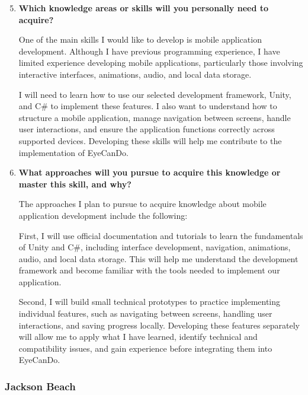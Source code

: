 \documentclass[10pt]{article}
\begin{document}
\begin{enumerate}
    \setcounter{enumi}{4}

    \item \textbf{Which knowledge areas or skills will you personally
    need to acquire?}

    One of the main skills I would like to develop is mobile
    application development. Although I have previous programming
    experience, I have limited experience developing mobile
    applications, particularly those involving interactive
    interfaces, animations, audio, and local data storage.

    I will need to learn how to use our selected development
    framework, Unity, and C\# to implement these features.
    I also want to understand how to structure a mobile
    application, manage navigation between screens, handle
    user interactions, and ensure the application functions
    correctly across supported devices. Developing these
    skills will help me contribute to the implementation
    of EyeCanDo.


    \item \textbf{What approaches will you pursue to acquire this
    knowledge or master this skill, and why?}

    The approaches I plan to pursue to acquire knowledge about
    mobile application development include the following:

    First, I will use official documentation and tutorials
    to learn the fundamentals of Unity and C\#, including
    interface development, navigation, animations, audio,
    and local data storage. This will help me understand
    the development framework and become familiar with
    the tools needed to implement our application.

    Second, I will build small technical prototypes to
    practice implementing individual features, such as
    navigating between screens, handling user interactions,
    and saving progress locally. Developing these features
    separately will allow me to apply what I have learned,
    identify technical and compatibility issues, and gain
    experience before integrating them into EyeCanDo.

\end{enumerate}

\subsubsection*{Jackson Beach}
\end{document}
